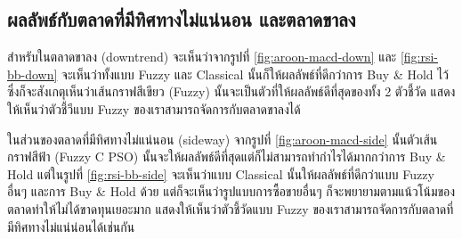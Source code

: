 \subsection{ผลลัพธ์กับตลาดที่มีทิศทางไม่แน่นอน และตลาดขาลง}
สำหรับในตลาดขาลง (downtrend) จะเห็นว่าจากรูปที่ \ref{fig:aroon-macd-down} และ \ref{fig:rsi-bb-down} จะเห็นว่าทั้งแบบ Fuzzy และ Classical นั้นก็ให้ผลลัพธ์ที่ดีกว่าการ Buy \& Hold ไว้ซึ่งก็จะสังเกตุเห็นว่าเส้นกราฟสีเขียว (Fuzzy) นั้นจะเป็นตัวที่ให้ผลลัพธ์ดีที่สุดของทั้ง 2 ตัวชี้วัด แสดงให้เห็นว่าตัวชี้วีแบบ Fuzzy ของเราสามารถจัดการกับตลาดขาลงได้

ในส่วนของตลาดที่มีทิศทางไม่แน่นอน (sideway) จากรูปที่ \ref{fig:aroon-macd-side} นั้นตัวเส้นกราฟสีฟ้า (Fuzzy C PSO) นั้นจะให้ผลลัพธ์ดีที่สุดแต่ก็ไม่สามารถทำกำไรได้มากกว่าการ Buy \& Hold แต่ในรูปที่ \ref{fig:rsi-bb-side} จะเห็นว่าแบบ Classical นั้นให้ผลลัพธ์ที่ดีกว่าแบบ Fuzzy อื่นๆ และการ Buy \& Hold ด้วย แต่ก็จะเห็นว่ารูปแบบการซื้อขายอื่นๆ ก็จะพยายามตามแน้วโน้มของตลาดทำให้ไม่ได้ขาดทุนเยอะมาก แสดงให้เห็นว่าตัวชี้วัดแบบ Fuzzy ของเราสามารถจัดการกับตลาดที่มีทิศทางไม่แน่น่อนได้เช่นกัน